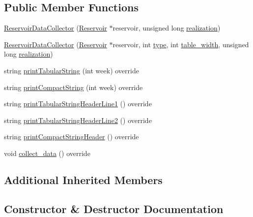 \subsection*{Public Member Functions}
\begin{DoxyCompactItemize}
\item 
\mbox{\hyperlink{classReservoirDataCollector_a7647adce7b2d7a8598ae678a5015dde5}{Reservoir\+Data\+Collector}} (\mbox{\hyperlink{classReservoir}{Reservoir}} $\ast$reservoir, unsigned long \mbox{\hyperlink{classDataCollector_a9ef2887466fe3123aa19ef956a219b96}{realization}})
\item 
\mbox{\hyperlink{classReservoirDataCollector_aaca132902fa717e71a0b0d5d5078c04c}{Reservoir\+Data\+Collector}} (\mbox{\hyperlink{classReservoir}{Reservoir}} $\ast$reservoir, int \mbox{\hyperlink{classDataCollector_acad1c22d67a8eb3db056ba776a131900}{type}}, int \mbox{\hyperlink{classDataCollector_af46c27a47de92d92dcdae6b26a905a44}{table\+\_\+width}}, unsigned long \mbox{\hyperlink{classDataCollector_a9ef2887466fe3123aa19ef956a219b96}{realization}})
\item 
string \mbox{\hyperlink{classReservoirDataCollector_a81777b029bf26be403b9f4d67f01588b}{print\+Tabular\+String}} (int week) override
\item 
string \mbox{\hyperlink{classReservoirDataCollector_a0b68d7fa4a6d704350340d1ac3e8a1d2}{print\+Compact\+String}} (int week) override
\item 
string \mbox{\hyperlink{classReservoirDataCollector_a62e7c7abc34c8154b338dfbd284ed665}{print\+Tabular\+String\+Header\+Line1}} () override
\item 
string \mbox{\hyperlink{classReservoirDataCollector_ae2f8e808c5960608e510a64c7f00ad1b}{print\+Tabular\+String\+Header\+Line2}} () override
\item 
string \mbox{\hyperlink{classReservoirDataCollector_aa8346433f037bbca41f3c8450f7f88cf}{print\+Compact\+String\+Header}} () override
\item 
void \mbox{\hyperlink{classReservoirDataCollector_a5c2e1355c40e45b409168e98245eef95}{collect\+\_\+data}} () override
\end{DoxyCompactItemize}
\subsection*{Additional Inherited Members}


\subsection{Constructor \& Destructor Documentation}
\mbox{\label{classReservoirDataCollector_a7647adce7b2d7a8598ae678a5015dde5}} 
